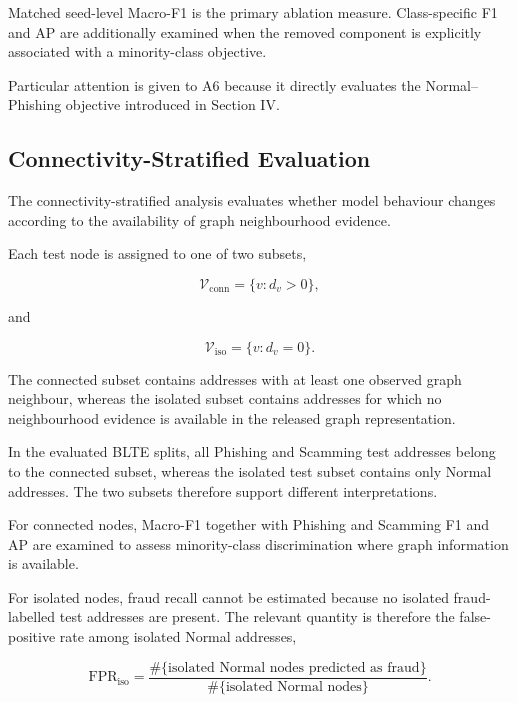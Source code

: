 \documentclass{ieeeaccess}
\begin{document}
Matched seed-level Macro-F1 is the primary ablation measure. Class-specific F1 and AP are additionally examined when the removed component is explicitly associated with a minority-class objective.

Particular attention is given to A6 because it directly evaluates the Normal--Phishing objective introduced in Section IV.


\subsection{Connectivity-Stratified Evaluation}

The connectivity-stratified analysis evaluates whether model behaviour changes according to the availability of graph neighbourhood evidence.

Each test node is assigned to one of two subsets,

\begin{equation}
\mathcal{V}_{\mathrm{conn}}
=
\{v:d_v>0\},
\end{equation}

and

\begin{equation}
\mathcal{V}_{\mathrm{iso}}
=
\{v:d_v=0\}.
\end{equation}

The connected subset contains addresses with at least one observed graph neighbour, whereas the isolated subset contains addresses for which no neighbourhood evidence is available in the released graph representation.

In the evaluated BLTE splits, all Phishing and Scamming test addresses belong to the connected subset, whereas the isolated test subset contains only Normal addresses. The two subsets therefore support different interpretations.

For connected nodes, Macro-F1 together with Phishing and Scamming F1 and AP are examined to assess minority-class discrimination where graph information is available.

For isolated nodes, fraud recall cannot be estimated because no isolated fraud-labelled test addresses are present. The relevant quantity is therefore the false-positive rate among isolated Normal addresses,

\begin{equation}
\mathrm{FPR}_{\mathrm{iso}}
=
\frac{
\#\{\text{isolated Normal nodes predicted as fraud}\}
}{
\#\{\text{isolated Normal nodes}\}
}.
\label{eq:fpr_iso}
\end{equation}
\end{document}
